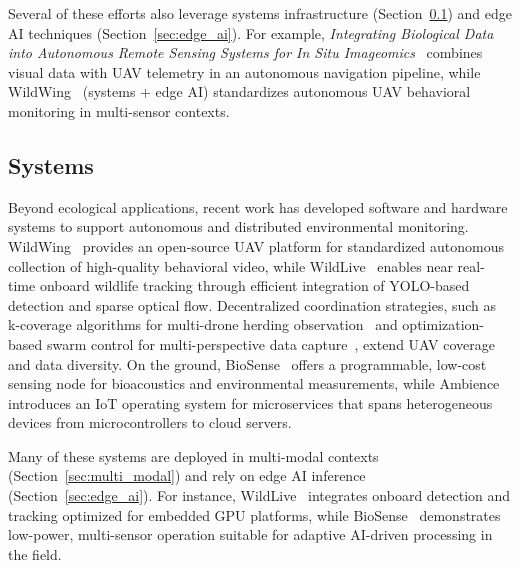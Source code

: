 \documentclass[letterpaper,twocolumn,10pt]{article}
\begin{document}
Several of these efforts also leverage systems infrastructure (Section~\ref{sec:systems}) and edge AI techniques (Section~\ref{sec:edge_ai}). For example, \textit{Integrating Biological Data into Autonomous Remote Sensing Systems for In Situ Imageomics}~\cite{kline2024integrating} combines visual data with UAV telemetry in an autonomous navigation pipeline, while WildWing~\cite{kline} (systems + edge AI) standardizes autonomous UAV behavioral monitoring in multi-sensor contexts.

\subsection{Systems}
\label{sec:systems}
Beyond ecological applications, recent work has developed software and hardware systems to support autonomous and distributed environmental monitoring. WildWing~\cite{kline2025wildwing} provides an open-source UAV platform for standardized autonomous collection of high-quality behavioral video, while WildLive~\cite{nguyen2025wildlive} enables near real-time onboard wildlife tracking through efficient integration of YOLO-based detection and sparse optical flow. Decentralized coordination strategies, such as k-coverage algorithms for multi-drone herding observation~\cite{grushchak2024decentralized} and optimization-based swarm control for multi-perspective data capture~\cite{rolland2024drone}, extend UAV coverage and data diversity. On the ground, BioSense~\cite{contina2024biosense} offers a programmable, low-cost sensing node for bioacoustics and environmental measurements, while Ambience~\cite{bakir2024ambience} introduces an IoT operating system for microservices that spans heterogeneous devices from microcontrollers to cloud servers.  

Many of these systems are deployed in multi-modal contexts (Section~\ref{sec:multi_modal}) and rely on edge AI inference (Section~\ref{sec:edge_ai}). For instance, WildLive~\cite{nguyen2025wildlive} integrates onboard detection and tracking optimized for embedded GPU platforms, while BioSense~\cite{contina2024biosense} demonstrates low-power, multi-sensor operation suitable for adaptive AI-driven processing in the field.
\end{document}
